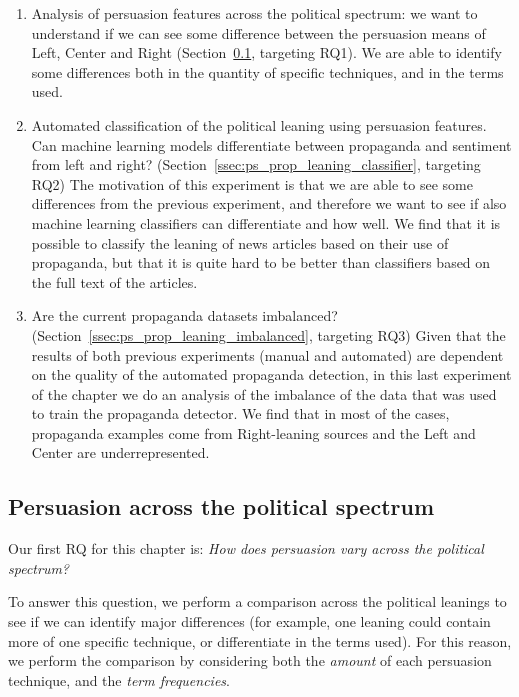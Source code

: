 \begin{enumerate}
    \item Analysis of persuasion features across the political spectrum: we want to understand if we can see some difference between the persuasion means of Left, Center and Right (Section~\ref{ssec:ps_prop_leaning_across}, targeting RQ1). We are able to identify some differences both in the quantity of specific techniques, and in the terms used.
    \item Automated classification of the political leaning using persuasion features. Can machine learning models differentiate between propaganda and sentiment from left and right? (Section~\ref{ssec:ps_prop_leaning_classifier}, targeting RQ2) The motivation of this experiment is that we are able to see some differences from the previous experiment, and therefore we want to see if also machine learning classifiers can differentiate and how well. We find that it is possible to classify the leaning of news articles based on their use of propaganda, but that it is quite hard to be better than classifiers based on the full text of the articles. 
    \item Are the current propaganda datasets imbalanced? (Section~\ref{ssec:ps_prop_leaning_imbalanced}, targeting RQ3) Given that the results of both previous experiments (manual and automated) are dependent on the quality of the automated propaganda detection, in this last experiment of the chapter we do an analysis of the imbalance of the data that was used to train the propaganda detector. We find that in most of the cases, propaganda examples come from Right-leaning sources and the Left and Center are underrepresented.
\end{enumerate}

\subsection{\statusgreen Persuasion across the political spectrum}
\label{ssec:ps_prop_leaning_across}

Our first RQ for this chapter is: \emph{How does persuasion vary across the political spectrum?}

To answer this question, we perform a comparison across the political leanings to see if we can identify major differences (for example, one leaning could contain more of one specific technique, or differentiate in the terms used).
For this reason, we perform the comparison by considering both the \emph{amount} of each persuasion technique, and the \emph{term frequencies}.


